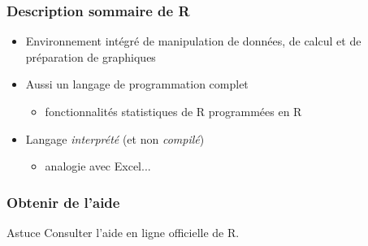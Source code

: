 \begin{frame}
  \frametitle{Description sommaire de R}

  \begin{itemize}
  \item Environnement intégré de manipulation de données, de calcul et
    de préparation de graphiques
  \item Aussi un langage de programmation complet
    \begin{itemize}
    \item fonctionnalités statistiques de R programmées en R
    \end{itemize}
  \item Langage \emph{interprété} (et non \emph{compilé})
    \begin{itemize}
    \item analogie avec Excel...
    \end{itemize}
  \end{itemize}

  \pause
\end{frame}

\begin{frame}
  \frametitle{Obtenir de l'aide}

  \begin{alertblock}{Astuce}
    Consulter l'aide en ligne officielle de R.
  \end{alertblock}
\end{frame}

